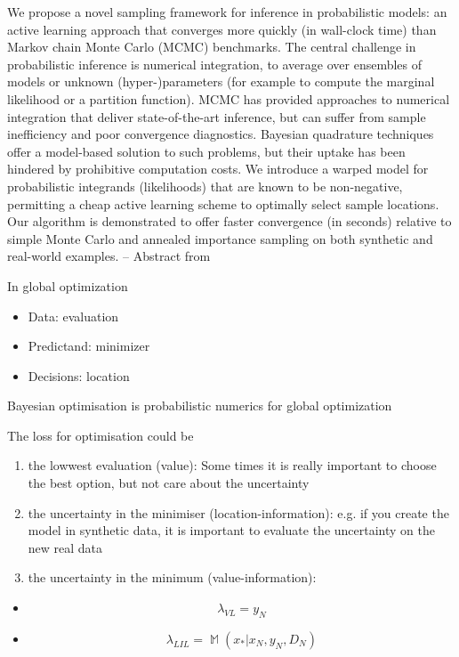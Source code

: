 \documentclass[b5paper]{report}
\begin{document}
\begin{mybox}
  We propose a novel sampling framework for inference in probabilistic models: an
active learning approach that converges more quickly (in wall-clock time) than
Markov chain Monte Carlo (MCMC) benchmarks. The central challenge in probabilistic
inference is numerical integration, to average over ensembles of models or
unknown (hyper-)parameters (for example to compute the marginal likelihood or
a partition function). MCMC has provided approaches to numerical integration that
deliver state-of-the-art inference, but can suffer from sample inefficiency and poor
convergence diagnostics. Bayesian quadrature techniques offer a model-based
solution to such problems, but their uptake has been hindered by prohibitive computation
costs. We introduce a warped model for probabilistic integrands (likelihoods)
that are known to be non-negative, permitting a cheap active learning
scheme to optimally select sample locations. Our algorithm is demonstrated to
offer faster convergence (in seconds) relative to simple Monte Carlo and annealed
importance sampling on both synthetic and real-world examples. -- Abstract from
\cite{gunter2014sampling}
\end{mybox}

In global optimization

\begin{itemize}
  \item Data: evaluation
  \item Predictand: minimizer
  \item Decisions: location
\end{itemize}

Bayesian optimisation is probabilistic numerics for global optimization

The loss for optimisation could be

\begin{enumerate}
  \item the lowwest evaluation (value): Some times it is really important to
    choose the best option, but not care about the uncertainty
  \item the uncertainty in the minimiser (location-information): e.g. if you
    create the model in synthetic data, it is important to evaluate the
    uncertainty on the new real data
  \item the uncertainty in the minimum (value-information):
\end{enumerate}


\begin{itemize}
    \item
    \begin{equation}
      \lambda_{VL} = y_N
    \end{equation}
    \item
    \begin{equation}
      \lambda_{LIL} = \mathbb{\mathop{M}} (x_* | x_N, y_N, D_N)
    \end{equation}
\end{itemize}
\end{document}
